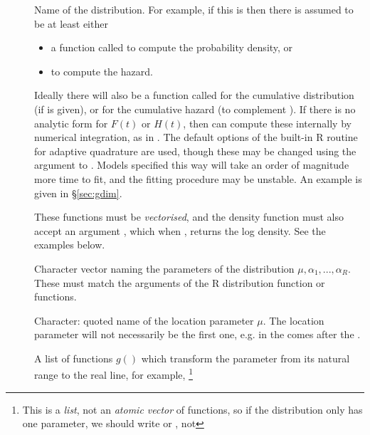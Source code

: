 \documentclass[nojss,nofooter]{jss}
\begin{document}
\begin{description}
\item[] Name of the distribution.  For example, if this is  then there is assumed to be at least either 
  
  \begin{itemize}
  \item  a function called  to compute the probability density, or 
  \item {} to compute the hazard.  
  \end{itemize}
  
  Ideally there will also be a function called  for the
  cumulative distribution (if  is given), or  for the
  cumulative hazard (to complement ).  If there is no analytic
  form for $F(t)$ or $H(t)$, then  can compute these
  internally by numerical integration, as in 
  \citep{stgenreg}.  The default options of the built-in R routine
   for adaptive quadrature are used, though these may
  be changed using the  argument to
  .  Models specified this way will take an order of
  magnitude more time to fit, and the fitting procedure may be unstable.
  An example is given in \S\ref{sec:gdim}.
  
  These functions must be \emph{vectorised}, and the density function
  must also accept an argument , which when ,
  returns the log density.  See the examples below.
  
\item[] Character vector naming the parameters of the
  distribution $\mu,\alpha_1,...,\alpha_R$.  These must match the
  arguments of the R distribution function or functions.
  
\item[] Character: quoted name of the location parameter $\mu$.
  The location parameter will not necessarily be the first one, e.g. 
  in  the  comes after the .
  
\item[] A list of functions $g()$ which transform the parameter from its natural range to the real line, for example,  \footnote{This is a \emph{list}, not an \emph{atomic vector} of functions, so if the distribution only has one parameter, we should write  or , not }


\end{description}
\end{document}
